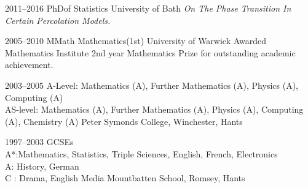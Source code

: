 \documentclass[print, oneside]{friggeri-cv} %
\begin{document}
\begin{entrylist}
\entry
{2011--2016}
{PhD}{of Statistics}
{University of Bath}
{\emph{On The Phase Transition In Certain Percolation Models.}}


\entry
{2005--2010}
{MMath Mathematics}{(1st)}
{University of Warwick}
{Awarded Mathematics Institute 2nd year Mathematics Prize for outstanding academic achievement.}


\entrybasic
{2003--2005}
{A-Level{\normalfont : Mathematics (A), Further Mathematics (A), Physics (A), Computing (A) }\\ 
AS-level{\normalfont : Mathematics (A), Further Mathematics (A), Physics (A), Computing (A), Chemistry (A)}}
{Peter Symonds College, Winchester, Hants}
{}


\entrybasic
{1997--2003}
{GCSEs\\
{A*{\normalfont :Mathematics, Statistics, Triple Sciences, English, French, Electronics\\}
A{\normalfont : History, German\\}
C \normalfont : Drama, English Media}}
{Mountbatten School, Romsey, Hants}{}

%
%
%
%

\end{entrylist}

\pagebreak
\end{document}
